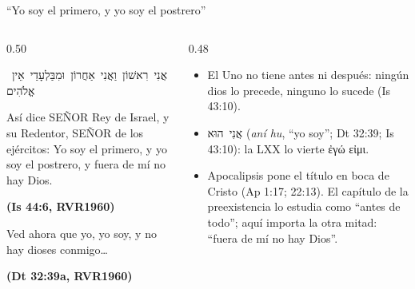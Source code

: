 \documentclass[hyperref={bookmarks=false},aspectratio=169]{beamer}
\newcommand{\heb}[1]{\mbox{\foreignlanguage{hebrew}{#1}}}
\newcommand{\grc}[1]{\foreignlanguage{ancientgreek}{#1}}
\newcommand{\SENOR}{S{\fontsize{0.78em}{1em}\selectfont EÑOR}}
\newcommand{\fuente}[1]{\par\hfill{\upshape\bfseries\footnotesize\textcolor{azul}{#1}}}
\begin{document}
\begin{frame}{``Yo soy el primero, y yo soy el postrero''}
\begin{columns}[t,onlytextwidth]
\begin{column}{0.50\textwidth}
\begin{center}\small\heb{אֲנִי רִאשׁוֹן וַאֲנִי אַחֲרוֹן וּמִבַּלְעָדַי אֵין אֱלֹהִים}\end{center}
\begin{cita}Así dice \SENOR{} Rey de Israel, y su Redentor, \SENOR{} de los ejércitos: Yo soy el primero, y yo soy el postrero, y fuera de mí no hay Dios.\fuente{(Is 44:6, RVR1960)}\end{cita}
\begin{cita}[fontupper=\scriptsize\itshape]Ved ahora que yo, yo soy, y no hay dioses conmigo\ldots\fuente{(Dt 32:39a, RVR1960)}\end{cita}
\end{column}
\begin{column}{0.48\textwidth}\small
\begin{itemize}
\item El Uno no tiene antes ni después: ningún dios lo precede, ninguno lo sucede (Is 43:10).
\item \heb{אֲנִי הוּא} (\emph{aní hu}, ``yo soy''; Dt 32:39; Is 43:10): la LXX lo vierte \grc{ἐγώ εἰμι}.
\item Apocalipsis pone el título en boca de Cristo (Ap 1:17; 22:13). El capítulo de la preexistencia lo estudia como ``antes de todo''; aquí importa la otra mitad: ``fuera de mí no hay Dios''.
\end{itemize}
\end{column}
\end{columns}
\end{frame}
\end{document}
